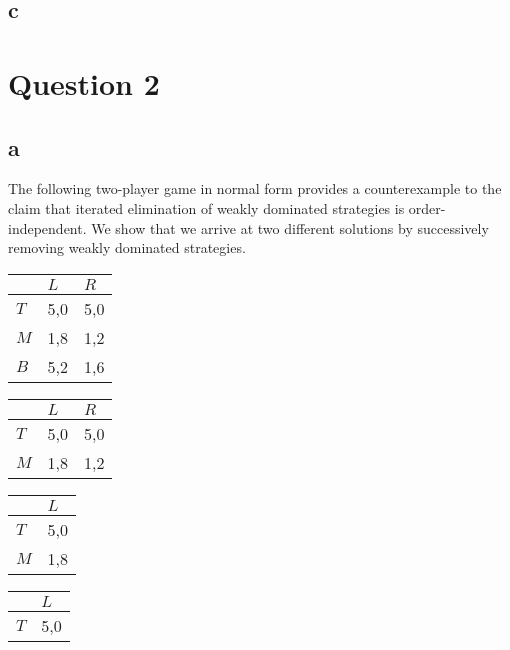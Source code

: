 \documentclass[10pt,a4paper]{article}
\begin{document}
\subsection*{c}

\section*{Question 2}
\subsection*{a}
The following two-player game in normal form provides a counterexample to the claim that iterated elimination of weakly dominated strategies is order-independent. We show that we arrive at two different solutions by successively removing weakly dominated strategies.

\begin{table}[h]
\begin{tabular}{|l|l|l|}
\hline
          & $L$ & $R$  \\ \hline
$T$     & 5,0   & 5,0 \\ \hline
$M$     & 1,8 & 1,2  \\ \hline
$B$		& 5,2	& 1,6 \\ \hline
\end{tabular}
\end{table}

\begin{table}[h]
\begin{tabular}{|l|l|l|}
\hline
          & $L$ & $R$  \\ \hline
$T$     & 5,0   & 5,0 \\ \hline
$M$     & 1,8 & 1,2  \\ \hline
\end{tabular}
\end{table}

\begin{table}[h]
\begin{tabular}{|l|l|}
\hline
          & $L$\\ \hline
$T$     & 5,0 \\ \hline
$M$     & 1,8\\ \hline
\end{tabular}
\end{table}
\begin{table}[h]
\begin{tabular}{|l|l|}
\hline
          & $L$\\ \hline
$T$     & 5,0 \\ \hline
\end{tabular}
\end{table} 
\end{document}

